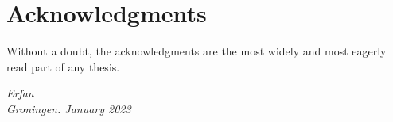 \chapter*{Acknowledgments}

Without a doubt, the acknowledgments are the most widely and most
eagerly read part of any thesis.

\begin{flushright}
{\makeatletter\itshape
    Erfan\\
    Groningen. January 2023
\makeatother}
\end{flushright}


